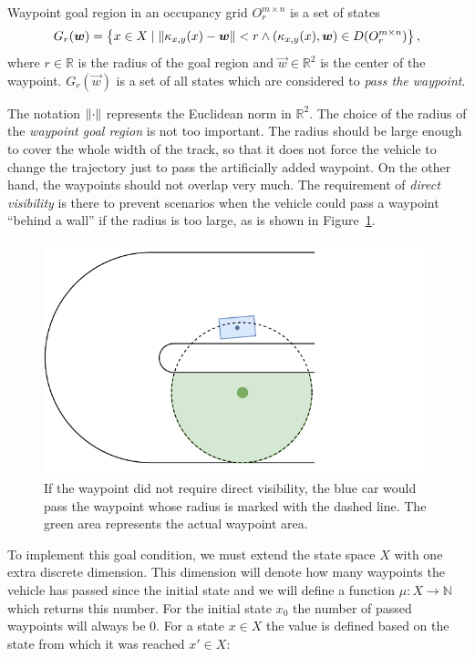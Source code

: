 \begin{defn}[Waypoint]
	Waypoint goal region in an occupancy grid $O_r^{m\times n}$ is a set of states
	\[
		G_r(\bm{w})=\left\{x\in X \mid \left\lVert\kappa_{x,y}(x)-\bm{w}\right\rVert<r \land (\kappa_{x,y}(x), \bm{w}) \in D(O_r^{m\times n}) \right\},
	\]
	where $r\in \mathbb{R}$ is the radius of the goal region and $\vec{w}\in\mathbb{R}^2$ is the center of the waypoint. $G_r(\vec{w})$ is a set of all states which are considered to \textit{pass the waypoint}.
\end{defn}

The notation $\left\lVert\cdot\right\rVert$ represents the Euclidean norm in $\mathbb{R}^2$. The choice of the radius of the \textit{waypoint goal region} is not too important. The radius should be large enough to cover the whole width of the track, so that it does not force the vehicle to change the trajectory just to pass the artificially added waypoint. On the other hand, the waypoints should not overlap very much. The requirement of \textit{direct visibility} is there to prevent scenarios when the vehicle could pass a waypoint ``behind a wall'' if the radius is too large, as is shown in Figure~\ref{fig:waypoints}.

\begin{figure}
	\centering
	\includegraphics[width=\textwidth,trim=0 0 80 0, clip]{../img/waypoint_behind_wall}
	\caption{If the waypoint did not require direct visibility, the blue car would pass the waypoint whose radius is marked with the dashed line. The green area represents the actual waypoint area.}
	\label{fig:waypoints}
\end{figure}

To implement this goal condition, we must extend the state space $X$ with one extra discrete dimension. This dimension will denote how many waypoints the vehicle has passed since the initial state and we will define a function $\mu: X\rightarrow \mathbb{N}$ which returns this number. For the initial state $x_0$ the number of passed waypoints will always be 0. For a state $x\in X$ the value is defined based on the state from which it was reached $x'\in X$: 

